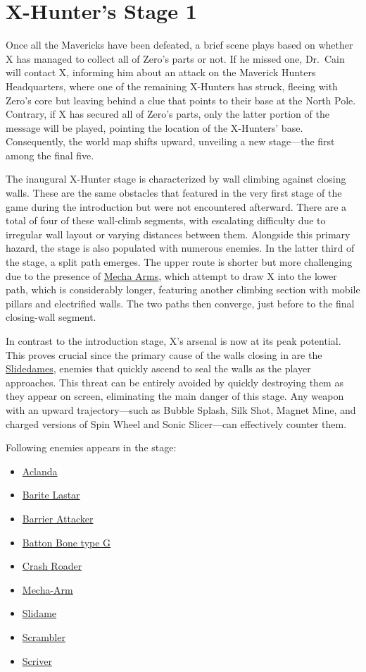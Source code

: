 \section{X-Hunter's Stage 1}

Once all the Mavericks have been defeated, a brief scene plays based on whether X has managed to collect all of Zero's parts or not. If he missed one, Dr.~Cain will contact X, informing him about an attack on the Maverick Hunters Headquarters, where one of the remaining X-Hunters has struck, fleeing with Zero's core but leaving behind a clue that points to their base at the North Pole. Contrary, if X has secured all of Zero's parts, only the latter portion of the message will be played, pointing the location of the X-Hunters' base. Consequently, the world map shifts upward, unveiling a new stage—the first among the final five.

The inaugural X-Hunter stage is characterized by wall climbing against closing walls. These are the same obstacles that featured in the very first stage of the game during the introduction but were not encountered afterward. There are a total of four of these wall-climb segments, with escalating difficulty due to irregular wall layout or varying distances between them. Alongside this primary hazard, the stage is also populated with numerous enemies. In the latter third of the stage, a split path emerges. The upper route is shorter but more challenging due to the presence of \hyperlink{enem:Mecha-Arm}{Mecha Arms}, which attempt to draw X into the lower path, which is considerably longer, featuring another climbing section with mobile pillars and electrified walls. The two paths then converge, just before to the final closing-wall segment.

In contrast to the introduction stage, X's arsenal is now at its peak potential. This proves crucial since the primary cause of the walls closing in are the  \hyperlink{enem:Slidame}{Slidedames}, enemies that quickly ascend to seal the walls as the player approaches. This threat can be entirely avoided by quickly destroying them as they appear on screen, eliminating the main danger of this stage. Any weapon with an upward trajectory—such as Bubble Splash, Silk Shot, Magnet Mine, and charged versions of Spin Wheel and Sonic Slicer—can effectively counter them.

Following enemies appears in the stage:
\begin{itemize}
	\item \hyperlink{enem:Aclanda}{Aclanda}
	\item \hyperlink{enem:Barite_Lastar}{Barite Lastar}
	\item \hyperlink{enem:Barrier_Attacker}{Barrier Attacker}
	\item \hyperlink{enem:Batton_Bone_type_G}{Batton Bone type G}
	\item \hyperlink{enem:Crash_Roader}{Crash Roader}
	\item \hyperlink{enem:Mecha-Arm}{Mecha-Arm}
	\item \hyperlink{enem:Slidame}{Slidame}
	\item \hyperlink{enem:Scrambler}{Scrambler}
	\item \hyperlink{enem:Scriver}{Scriver}
\end{itemize}

